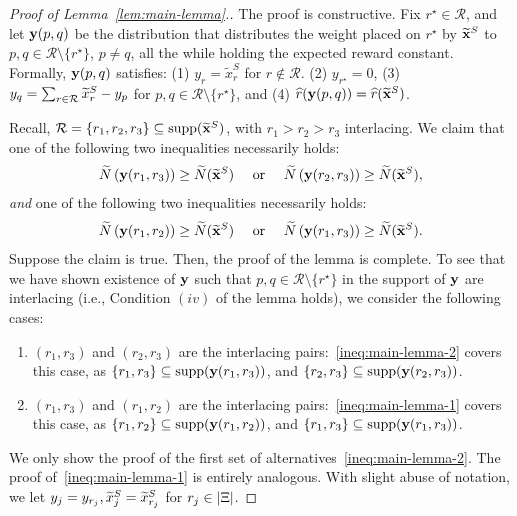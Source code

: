 \documentclass[12pt]{article}
\begin{document}
\begin{proof}[Proof of Lemma~\ref{lem:main-lemma}.]
The proof is constructive. Fix ${r}^\star \in \mathcal{R}$, and let $\mathbf{y}(p,q)$ be the distribution that distributes the weight placed on $r^\star$ by $\widetilde{\mathbf{x}}^S$ to $p, q \in \mathcal{R} \setminus \{r^\star\}$, $p\neq q$, all the while holding the expected reward constant. Formally, $\mathbf{y}(p,q)$ satisfies:
    (1) $y_{r} = \widetilde{x}_{r}^S$ for $r \not\in \mathcal{R}$.
    (2) $y_{r^\star} = 0$,
    (3) $y_{q} = \sum_{r\in\mathcal{R}}\widetilde{x}^S_r - y_{p}$ for $p, q \in \mathcal{R}\setminus \{r^\star\}$, and
    (4) $\widehat{r}(\mathbf{y}(p,q)) = \widehat{r}(\widetilde{\mathbf{x}}^S)$.
    
    
Recall, $\mathcal{R} = \{r_1, r_2, r_3\} \subseteq \text{supp}(\widetilde{\mathbf{x}}^S)$, with $r_1 > r_2 > r_3$ interlacing. We claim that one of the following two inequalities necessarily holds:
\begin{align}\label{ineq:main-lemma-2}
\widetilde{N}\left(\mathbf{y}(r_1,r_3)\right) \geq \widetilde{N}(\widetilde{\mathbf{x}}^S) \quad \text{ or } \quad \widetilde{N}\left(\mathbf{y}(r_2,r_3)\right) \geq \widetilde{N}(\widetilde{\mathbf{x}}^S),
\end{align}
{\it and} one of the following two inequalities necessarily holds:
\begin{align}\label{ineq:main-lemma-1}
\widetilde{N}\left(\mathbf{y}(r_1,r_2)\right) \geq \widetilde{N}(\widetilde{\mathbf{x}}^S) \quad \text{ or } \quad \widetilde{N}\left(\mathbf{y}(r_1,r_3)\right) \geq \widetilde{N}(\widetilde{\mathbf{x}}^S).
\end{align}
Suppose the claim is true. Then, the proof of the lemma is complete. To see that we have shown existence of $\mathbf{y}$ such that $p, q \in \mathcal{R}\setminus\{r^\star\}$ in the support of $\mathbf{y}$ are interlacing (i.e., Condition $(iv)$ of the lemma holds), we consider the following cases:
\begin{enumerate}
    \item $(r_1, r_3)$ and $(r_2, r_3)$ are the interlacing pairs:~\eqref{ineq:main-lemma-2} covers this case, as $\{r_1, r_3\}\subseteq \text{supp}(\mathbf{y}(r_1,r_3))$, and $\{r_2, r_3\}\subseteq \text{supp}(\mathbf{y}(r_2,r_3))$.
    \item $(r_1, r_3)$ and $(r_1, r_2)$ are the interlacing pairs:~\eqref{ineq:main-lemma-1} covers this case, as $\{r_1, r_2\} \subseteq \text{supp}(\mathbf{y}(r_1,r_2))$, and $\{r_1, r_3\} \subseteq \text{supp}(\mathbf{y}(r_1,r_3))$.
\end{enumerate}

We only show the proof of the first set of alternatives~\eqref{ineq:main-lemma-2}. The proof of~\eqref{ineq:main-lemma-1} is entirely analogous. With slight abuse of notation, we let $y_j = y_{r_j}, \widetilde{x}^S_j = \widetilde{x}^S_{r_j}$ for $r_j \in |\Xi|$.  


\end{proof}
\end{document}
